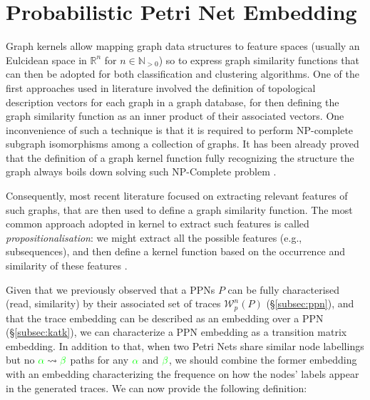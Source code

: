 \section{Probabilistic Petri Net Embedding}
Graph kernels allow mapping graph data structures to feature spaces (usually an Eulcidean space in $\mathbb{R}^n$ for $n\in \mathbb{N}_{>0}$) \cite{Samatova} so to express graph similarity functions that can then be adopted for both classification \cite{TsudaS10} and clustering \cite{Raedt} algorithms. One of the first approaches used in literature involved the definition of topological description vectors \cite{Sidere} for each graph in a graph database, for then defining the graph similarity function as an inner product of their associated vectors. One inconvenience of such a technique is that it is required to perform  NP-complete subgraph isomorphisms among a collection of graphs. It has been already proved that the definition of a graph kernel function fully recognizing the structure the graph always boils down solving such  NP-Complete problem \cite{GartnerFW03}. 


Consequently, most recent literature focused on extracting relevant features of such graphs, that are then used to define a graph similarity function. The most common approach adopted in kernel to extract such features is called \textit{propositionalisation}: we might extract all the possible features (e.g., subsequences), and then define a kernel function based on the occurrence and similarity of these features \cite{Gartner03}. 

Given that we previously observed that a PPNs $P$ can be fully characterised (read, similarity) by their associated set of traces $\mathcal{W}_p^n(P)$ (\S\ref{subsec:ppn}), and that the trace embedding can be described as an embedding over a PPN (\S\ref{subsec:katk}), we can characterize a PPN embedding as a transition matrix embedding. In addition to that, when two Petri Nets share similar node labellings but no ${\color{green}\alpha}\rightsquigarrow{\color{green}\beta}$ paths for any ${\color{green}\alpha}$ and ${\color{green}\beta}$, we should combine the former embedding with an embedding characterizing the frequence on how the nodes' labels appear in the generated traces. We can now provide the following definition:


